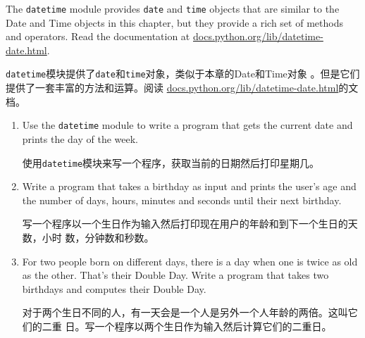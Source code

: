 \documentclass[10pt]{book}
\begin{document}
\begin{CJK}{UTF8}{gbsn}
\begin{exercise}
\end{exercise}





\begin{exercise}

The {\tt datetime} module provides {\tt date} and {\tt time} objects
that are similar to the Date and Time objects in this chapter, but
they provide a rich set of methods and operators.  Read the
documentation at \url{docs.python.org/lib/datetime-date.html}.

{\tt datetime}模块提供了{\tt date}和{\tt time}对象，类似于本章的Date和Time对象
。但是它们提供了一套丰富的方法和运算。阅读
\url{docs.python.org/lib/datetime-date.html}的文档。

\begin{enumerate}

\item Use the {\tt datetime} module to write a program that gets the
  current date and prints the day of the week.

使用{\tt datetime}模块来写一个程序，获取当前的日期然后打印星期几。

\item Write a program that takes a birthday as input and prints the
  user's age and the number of days, hours, minutes and seconds until
  their next birthday.

  写一个程序以一个生日作为输入然后打印现在用户的年龄和到下一个生日的天数，小时
  数，分钟数和秒数。

\item For two people born on different days, there is a day when one
  is twice as old as the other. That's their Double Day.  Write a
  program that takes two birthdays and computes their Double Day.

  对于两个生日不同的人，有一天会是一个人是另外一个人年龄的两倍。这叫它们的二重
  日。写一个程序以两个生日作为输入然后计算它们的二重日。


\end{enumerate}
\end{exercise}
\end{CJK}
\end{document}
